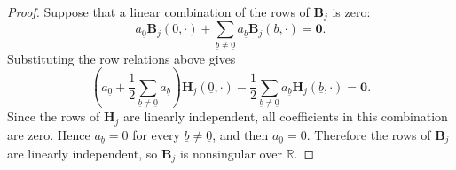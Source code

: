 \documentclass[letterpaper,draftclsnofoot,onecolumn]{IEEEtran}
\begin{document}
{\begin{proof}
Suppose that a linear combination of the rows of $\mathbf{B}_j$ is zero:
\begin{equation}
a_{\underline{0}}\mathbf{B}_j(\underline{0},\cdot)
+
\sum_{\underline{b}\neq\underline{0}}
a_{\underline{b}}\mathbf{B}_j(\underline{b},\cdot)
=
\mathbf{0}.
\end{equation}
Substituting the row relations above gives
\begin{equation}
\left(
a_{\underline{0}}
+
\frac{1}{2}\sum_{\underline{b}\neq\underline{0}}a_{\underline{b}}
\right)
\mathbf{H}_j(\underline{0},\cdot)
-
\frac{1}{2}
\sum_{\underline{b}\neq\underline{0}}
a_{\underline{b}}\mathbf{H}_j(\underline{b},\cdot)
=
\mathbf{0}.
\end{equation}
Since the rows of $\mathbf{H}_j$ are linearly independent, all coefficients in this combination are zero. Hence $a_{\underline{b}}=0$ for every $\underline{b}\neq\underline{0}$, and then $a_{\underline{0}}=0$. Therefore the rows of $\mathbf{B}_j$ are linearly independent, so $\mathbf{B}_j$ is nonsingular over $\mathbb{R}$.
\end{proof}
}






 
%
%
\end{document}
